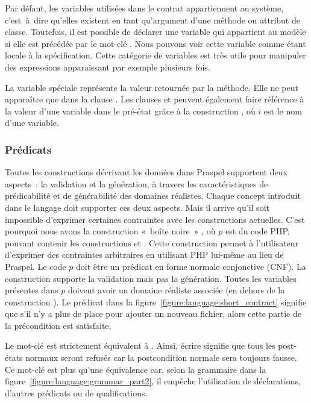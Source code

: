 Par défaut, les variables utilisées dans le contrat appartiennent au système,
c'est~à~dire qu'elles existent en tant qu'argument d'une méthode ou attribut de
classe. Toutefois, il est possible de déclarer une variable qui appartient au
modèle si elle est précédée par le mot-clé . Nous pouvons voir cette
variable comme étant locale à la spécification. Cette catégorie de variables est
très utile pour manipuler des expressions apparaissant par exemple plusieurs
fois.

La variable spéciale \aresult représente la valeur {\strong retournée} par la
méthode. Elle ne peut apparaître que dans la clause \aensures. Les clauses
\aensures et \athrowable peuvent également faire référence à la valeur d'une
variable dans le pré-état grâce à la construction , où $i$ est le nom
d'une variable.

\subsubsection{Prédicats}

Toutes les constructions décrivant les données dans Praspel supportent deux
aspects~: la validation et la génération, à travers les caractéristiques de
prédicabilité et de générabilité des domaines réalistes. Chaque concept
introduit dans le langage doit supporter ces deux aspects. Mais il arrive qu'il
soit impossible d'exprimer certaines contraintes avec les constructions
actuelles. C'est pourquoi nous avons la construction «~boîte noire~» ,
où $p$ est du code PHP, pouvant contenir les constructions \aresult et .
Cette construction  permet à l'utilisateur d'exprimer des contraintes
arbitraires en utilisant PHP lui-même au lieu de Praspel. Le code $p$ doit être
un prédicat en forme normale {\strong conjonctive} (CNF). La construction
 supporte la validation mais pas la génération. Toutes les variables
présentes dans $p$ doivent avoir un domaine réaliste associée (en dehors de la
construction ). Le prédicat  dans la figure~\ref{figure:language:short_contract} signifie
que s'il n'y a plus de place pour ajouter un nouveau fichier, alors cette partie
de la précondition est satisfaite.

Le mot-clé \anone est strictement équivalent à . Ainsi,
écrire \code{\aensures \anone;} signifie que tous les post-états normaux seront
refusés car la postcondition normale sera toujours fausse. Ce mot-clé est plus
qu'une équivalence car, selon la grammaire dans la
figure~\ref{figure:language:grammar_part2}, il empêche l'utilisation de
déclarations, d'autres prédicats ou de qualifications.

